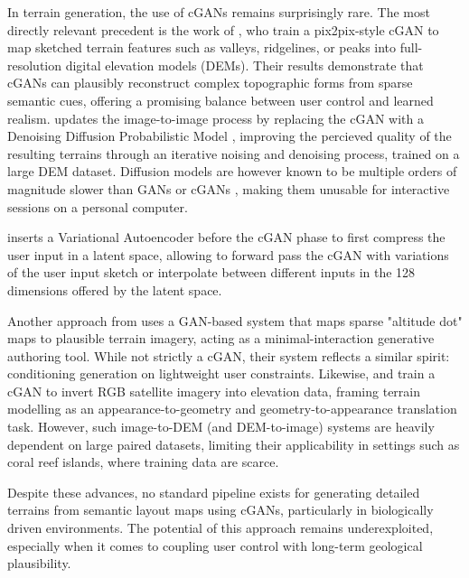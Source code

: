 In terrain generation, the use of cGANs remains surprisingly rare. The most directly relevant precedent is the work of \cite{Guerin2017}, who train a pix2pix-style cGAN to map sketched terrain features such as valleys, ridgelines, or peaks into full-resolution digital elevation models (DEMs). Their results demonstrate that cGANs can plausibly reconstruct complex topographic forms from sparse semantic cues, offering a promising balance between user control and learned realism.
\cite{Lochner2023} updates the image-to-image process by replacing the cGAN with a Denoising Diffusion Probabilistic Model \cite{Ho2020,Nichol2021}, improving the percieved quality of the resulting terrains through an iterative noising and denoising process, trained on a large DEM dataset. Diffusion models are however known to be multiple orders of magnitude slower than GANs or cGANs \cite{Xiao2022,Huang2023}, making them unusable for interactive sessions on a personal computer. 

\cite{Naik2022} inserts a Variational Autoencoder \cite{Kingma2022} before the cGAN phase to first compress the user input in a latent space, allowing to forward pass the cGAN with variations of the user input sketch or interpolate between different inputs in the 128 dimensions offered by the latent space. 

Another approach from \cite{Voulgaris2021} uses a GAN-based system that maps sparse "altitude dot" maps to plausible terrain imagery, acting as a minimal-interaction generative authoring tool. While not strictly a cGAN, their system reflects a similar spirit: conditioning generation on lightweight user constraints. Likewise, \cite{Panagiotou2020} and \cite{Beckham2017} train a cGAN to invert RGB satellite imagery into elevation data, framing terrain modelling as an appearance-to-geometry and geometry-to-appearance translation task. However, such image-to-DEM (and DEM-to-image) systems are heavily dependent on large paired datasets, limiting their applicability in settings such as coral reef islands, where training data are scarce.

Despite these advances, no standard pipeline exists for generating detailed terrains from semantic layout maps using cGANs, particularly in biologically driven environments. The potential of this approach remains underexploited, especially when it comes to coupling user control with long-term geological plausibility.

